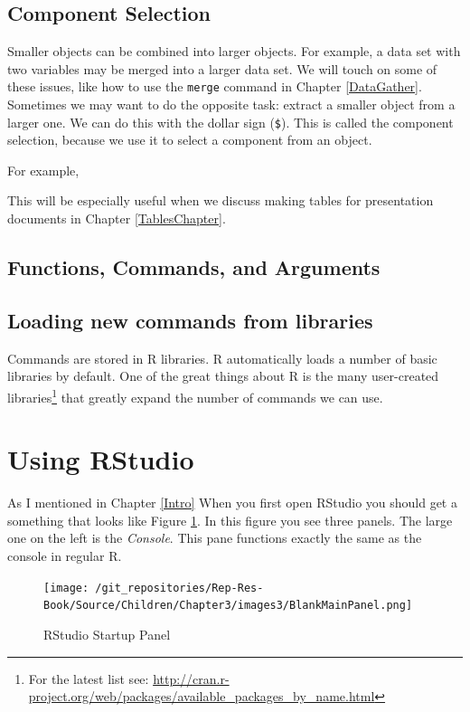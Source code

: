 \documentclass[ChapterTOCs,krantz1]{krantz}\usepackage{graphicx, color}
\begin{document}
\subsection{Component Selection}

Smaller objects can be combined into larger objects. For example, a data set with two variables may be merged into a larger data set. We will touch on some of these issues, like how to use the {\tt{merge}} command in Chapter \ref{DataGather}. Sometimes we may want to do the opposite task: extract a smaller object from a larger one. We can do this with the dollar sign ({\tt{\$}}). This is called the component selection, because we use it to select a component from an object.

For example, 

This will be especially useful when we discuss making tables for presentation documents in Chapter \ref{TablesChapter}.

\subsection{Functions, Commands, and Arguments}

\subsection{Loading new commands from libraries}

Commands are stored in R libraries. R automatically loads a number of basic libraries by default. One of the great things about R is the many user-created libraries\footnote{For the latest list see: \url{http://cran.r-project.org/web/packages/available_packages_by_name.html}} that greatly expand the number of commands we can use. 

\section{Using RStudio}

As I mentioned in Chapter \ref{Intro} When you first open RStudio you should get a something that looks like Figure \ref{BlankMain}. In this figure you see three panels. The large one on the left is the {\emph{Console}}. This pane functions exactly the same as the console in regular R. 

\begin{figure}[ht]
    \caption{RStudio Startup Panel}
    \label{BlankMain}

    \texttt{[image: /git\_repositories/Rep-Res-Book/Source/Children/Chapter3/images3/BlankMainPanel.png]}
\end{figure}
\end{document}
